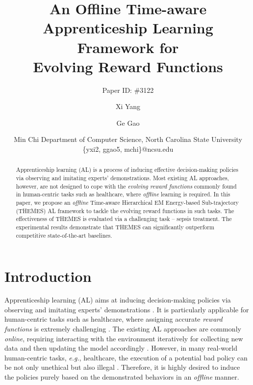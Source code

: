 \documentclass{article}
\title{An Offline Time-aware Apprenticeship Learning Framework for \\ 
Evolving Reward Functions}
\author{
    Paper ID: \#3122
}
\author{
Xi Yang  \and
Ge Gao \and
Min Chi 
\affiliations
Department of Computer Science, North Carolina State University \\
\emails
\{yxi2, ggao5, mchi\}@ncsu.edu
}
\begin{document}
\maketitle


\begin{abstract}
Apprenticeship learning (AL) is a process of inducing effective decision-making policies via observing and imitating experts' demonstrations. Most existing AL approaches, however, are not designed to cope with the \emph{evolving reward functions} commonly found in human-centric tasks such as healthcare, where \emph{offline} learning is required. In this paper, we propose an \emph{offline} Time-aware Hierarchical EM Energy-based Sub-trajectory (THEMES) AL framework to tackle the evolving reward functions in such tasks. The effectiveness of THEMES is evaluated via a challenging task -- sepsis treatment. The experimental results demonstrate that THEMES can significantly outperform competitive state-of-the-art baselines. 

\end{abstract}


\section{Introduction}


Apprenticeship learning (AL) aims at inducing decision-making policies via observing and imitating experts' demonstrations \cite{abbeel2004apprenticeship}. It is particularly applicable for human-centric tasks such as healthcare, where assigning accurate \emph{reward functions} is extremely challenging \cite{abbeel2004apprenticeship,babes2011apprenticeship}. The existing AL approaches are commonly \emph{online}, requiring interacting with the environment iteratively for collecting new data and then updating the model accordingly \cite{abbeel2004apprenticeship,ziebart2008maximum,ho2016generative,finn2016guided}. However, in many real-world human-centric tasks, \textit{e.g.}, healthcare, the execution of a potential bad policy can be not only unethical but also illegal \cite{levine2020offline}. Therefore, it is highly desired to induce the policies purely based on the demonstrated behaviors in an \emph{offline} manner. 
\end{document}
